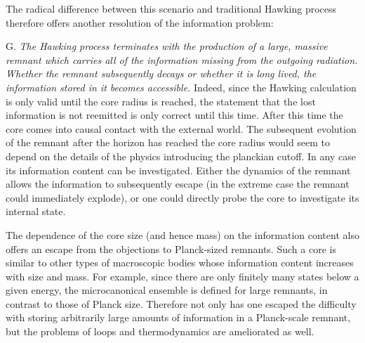 The radical difference between this scenario and traditional Hawking
process therefore
offers another resolution of the information problem:
\itemskip
\item{G.} {\it The Hawking process terminates with the production of a
large, massive remnant which carries all of the  information
missing from the outgoing radiation.  Whether the remnant subsequently
decays or whether it is long lived, the information stored in it becomes
accessible.}
\itemskip
Indeed,
since the
Hawking calculation is only valid until the core radius is reached,
the statement that the lost information is not reemitted is only
correct until this time.  After this time the core comes into causal
contact with the external world.  The subsequent evolution
of the remnant after the horizon has reached
the core radius would seem to depend on the details of the physics
introducing the planckian cutoff.  In any case its information
content can be investigated.  Either the dynamics of the remnant allows
the information to subsequently escape (in the extreme case the remnant
could immediately explode), or one could
directly probe the core to investigate its internal state.

The dependence of the core size (and hence mass) on the information
content also offers an escape from the objections to Planck-sized
remnants.  Such a core is similar to other types of macroscopic bodies
whose information content increases with size and mass.  For example,
since there are only finitely many states below a given
energy, the microcanonical ensemble is defined for large remnants, in
contrast to those of Planck size.
Therefore not only has one escaped the difficulty
with storing arbitrarily large amounts of information in a Planck-scale
remnant, but the problems of loops and thermodynamics are ameliorated as
well.
%

